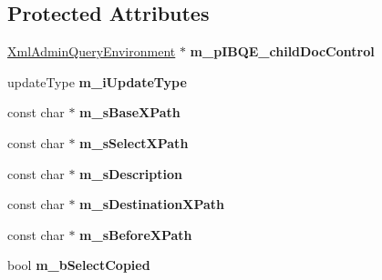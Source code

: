 \subsection*{\-Protected \-Attributes}
\begin{DoxyCompactItemize}
\item 
\hypertarget{classgeneral__server_1_1TXml_a72571911a614a74705596239fad70ab7}{\hyperlink{classgeneral__server_1_1XmlAdminQueryEnvironment}{\-Xml\-Admin\-Query\-Environment} $\ast$ {\bfseries m\-\_\-p\-I\-B\-Q\-E\-\_\-child\-Doc\-Control}}\label{classgeneral__server_1_1TXml_a72571911a614a74705596239fad70ab7}

\item 
\hypertarget{classgeneral__server_1_1TXml_a0230eb8a8f0cb539a09ee0d3d23990e6}{update\-Type {\bfseries m\-\_\-i\-Update\-Type}}\label{classgeneral__server_1_1TXml_a0230eb8a8f0cb539a09ee0d3d23990e6}

\item 
\hypertarget{classgeneral__server_1_1TXml_a2facd8300e52f065844cfc92369ae245}{const char $\ast$ {\bfseries m\-\_\-s\-Base\-X\-Path}}\label{classgeneral__server_1_1TXml_a2facd8300e52f065844cfc92369ae245}

\item 
\hypertarget{classgeneral__server_1_1TXml_aea9b509ff6a41eba5ca137b410db3d25}{const char $\ast$ {\bfseries m\-\_\-s\-Select\-X\-Path}}\label{classgeneral__server_1_1TXml_aea9b509ff6a41eba5ca137b410db3d25}

\item 
\hypertarget{classgeneral__server_1_1TXml_aa6be3dceffda47810a9542038519b094}{const char $\ast$ {\bfseries m\-\_\-s\-Description}}\label{classgeneral__server_1_1TXml_aa6be3dceffda47810a9542038519b094}

\item 
\hypertarget{classgeneral__server_1_1TXml_ad163e11bfab1f1c291c965396b74d356}{const char $\ast$ {\bfseries m\-\_\-s\-Destination\-X\-Path}}\label{classgeneral__server_1_1TXml_ad163e11bfab1f1c291c965396b74d356}

\item 
\hypertarget{classgeneral__server_1_1TXml_a68a41988c95e8eed9b9ef74c844407b6}{const char $\ast$ {\bfseries m\-\_\-s\-Before\-X\-Path}}\label{classgeneral__server_1_1TXml_a68a41988c95e8eed9b9ef74c844407b6}

\item 
\hypertarget{classgeneral__server_1_1TXml_aa9542d3de561bf5bc17b0fe4d39b9007}{bool {\bfseries m\-\_\-b\-Select\-Copied}}\label{classgeneral__server_1_1TXml_aa9542d3de561bf5bc17b0fe4d39b9007}


\end{DoxyCompactItemize}
